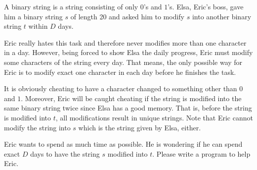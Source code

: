 A binary string is a string consisting of only $0$'s and $1$'s. 
Elsa, Eric's boss, gave him a binary string $s$ of length 20 and
asked him to modify $s$ into another binary string $t$ within $D$ days.

Eric really hates this task and therefore never modifies more than one 
character in a day.
However, being forced to show Elsa the daily progress,
Eric must modify some characters of the string every day.
That means, the only possible way for Eric is to modify exact one character 
in each day before he finishes the task.

It is obviously cheating to have a character changed to something other than 
$0$ and $1$.
Moreover, Eric will be caught cheating if the string is modified into the same
binary string twice since Elsa has a good memory.
That is, before the string is modified into $t$, all modifications result in
unique strings.
Note that Eric cannot modify the string into $s$ which is the string given by 
Elsa, either.

Eric wants to spend as much time as possible. 
He is wondering if he can spend exact $D$ days to have the string $s$
modified into $t$.
Please write a program to help Eric.
